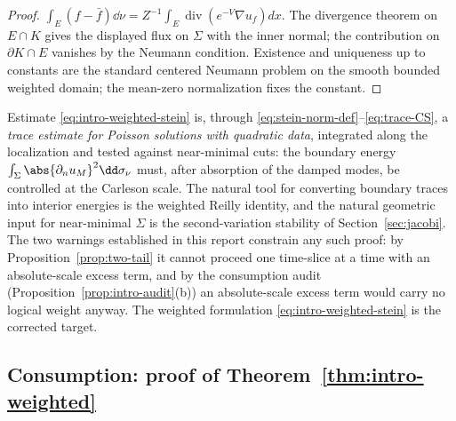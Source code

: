 \documentclass[../../main.tex]{subfiles}
\begin{document}
\begin{proof}
$\int_E(f-\bar f)\dd\nu=Z^{-1}\int_E\operatorname{div}(e^{-V}\nabla u_f)dx$.
The divergence theorem on $E\cap K$ gives the displayed flux on $\Sigma$ with the inner normal;
the contribution on $\partial K\cap E$ vanishes by the Neumann condition. Existence and
uniqueness up to constants are the standard centered Neumann problem on the smooth bounded
weighted domain; the mean-zero normalization fixes the constant.
\end{proof}

\begin{remark}
\label{rem:what-stein-is}
Estimate \eqref{eq:intro-weighted-stein} is, through
\eqref{eq:stein-norm-def}--\eqref{eq:trace-CS}, a \emph{trace estimate for Poisson solutions
with quadratic data}, integrated along the localization and tested against near-minimal cuts:
the boundary energy $\int_\Sigma\abs{\partial_nu_M}^2\dd\sigma_\nu$ must, after absorption of
the damped modes, be controlled at the Carleson scale. The natural tool for converting boundary
traces into interior energies is the weighted Reilly identity, and the natural geometric input
for near-minimal $\Sigma$ is the second-variation stability of Section~\ref{sec:jacobi}. The
two warnings established in this report constrain any such proof: by
Proposition~\ref{prop:two-tail} it cannot proceed one time-slice at a time with an
absolute-scale excess term, and by the consumption audit
(Proposition~\ref{prop:intro-audit}(b)) an absolute-scale excess term would carry no logical
weight anyway. The weighted formulation \eqref{eq:intro-weighted-stein} is the corrected
target.
\end{remark}

\subsection{Consumption: proof of Theorem~\ref{thm:intro-weighted}}
\label{subsec:consumption}
\end{document}
